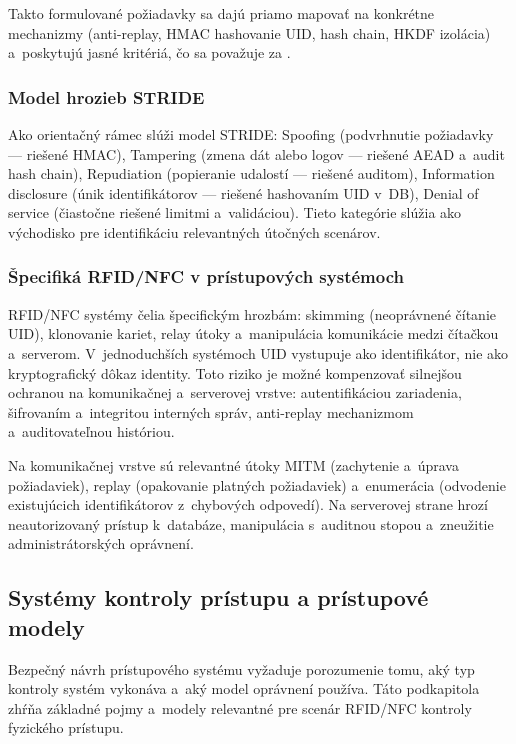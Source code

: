 Takto formulované požiadavky sa dajú priamo mapovať na konkrétne mechanizmy (anti-replay, HMAC hashovanie UID, hash chain, HKDF izolácia) a~poskytujú jasné kritériá, čo sa považuje za .

\subsubsection{Model hrozieb STRIDE}

Ako orientačný rámec slúži model STRIDE\cite{STRIDE}: Spoofing (podvrhnutie požiadavky --- riešené HMAC), Tampering (zmena dát alebo logov --- riešené AEAD a~audit hash chain), Repudiation (popieranie udalostí --- riešené auditom), Information disclosure (únik identifikátorov --- riešené hashovaním UID v~DB), Denial of service (čiastočne riešené limitmi a~validáciou). Tieto kategórie slúžia ako východisko pre identifikáciu relevantných útočných scenárov.

\subsubsection{Špecifiká RFID/NFC v prístupových systémoch}

RFID/NFC systémy čelia špecifickým hrozbám: skimming (neoprávnené čítanie UID), klonovanie kariet, relay útoky a~manipulácia komunikácie medzi čítačkou a~serverom\cite{GarciaMIFARE2008,VerdultMIFARE2015}. V~jednoduchších systémoch UID vystupuje ako identifikátor, nie ako kryptografický dôkaz identity. Toto riziko je možné kompenzovať silnejšou ochranou na komunikačnej a~serverovej vrstve: autentifikáciou zariadenia, šifrovaním a~integritou interných správ, anti-replay mechanizmom a~auditovateľnou históriou.

Na komunikačnej vrstve sú relevantné útoky MITM (zachytenie a~úprava požiadaviek), replay (opakovanie platných požiadaviek) a~enumerácia (odvodenie existujúcich identifikátorov z~chybových odpovedí). Na serverovej strane hrozí neautorizovaný prístup k~databáze, manipulácia s~auditnou stopou a~zneužitie administrátorských oprávnení\cite{NIST80094,ISO27001}.


\subsection{Systémy kontroly prístupu a prístupové modely}

Bezpečný návrh prístupového systému vyžaduje porozumenie tomu, aký typ kontroly systém vykonáva a~aký model oprávnení používa. Táto podkapitola zhŕňa základné pojmy a~modely relevantné pre scenár RFID/NFC kontroly fyzického prístupu.

